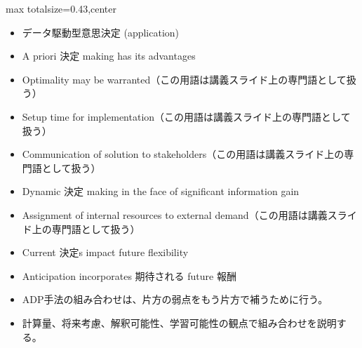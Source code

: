 \clearpage
{}
\begin{minipage}[t]{0.405\textwidth}
\begin{adjustbox}{max totalsize={\textwidth}{0.43\textheight},center}
\begin{minipage}{\textwidth}\scriptsize
{}\begin{itemize}
\item データ駆動型意思決定 (application)
\item A priori 決定 making has its advantages
\item Optimality may be warranted（この用語は講義スライド上の専門語として扱う）
\item Setup time for implementation（この用語は講義スライド上の専門語として扱う）
\item Communication of solution to stakeholders（この用語は講義スライド上の専門語として扱う）
\item Dynamic 決定 making in the face of significant information gain
\item Assignment of internal resources to external demand（この用語は講義スライド上の専門語として扱う）
\item Current 決定s impact future flexibility
\item Anticipation incorporates 期待される future 報酬
\end{itemize}\begin{itemize}
\item ADP手法の組み合わせは、片方の弱点をもう片方で補うために行う。
\item 計算量、将来考慮、解釈可能性、学習可能性の観点で組み合わせを説明する。
\end{itemize}
\end{minipage}
\end{adjustbox}
\end{minipage}\hfill
